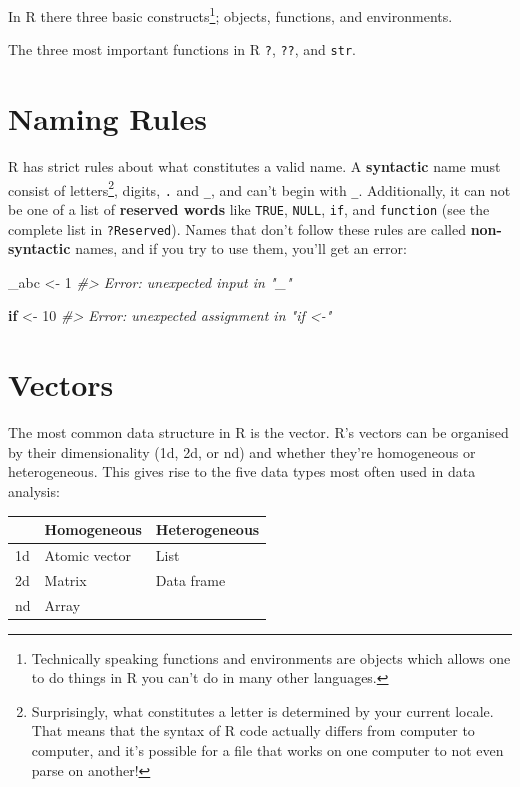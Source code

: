 \documentclass[]{book}
\newenvironment{Shaded}{\begin{snugshade}}{\end{snugshade}}
\newcommand{\DecValTok}[1]{\textcolor[rgb]{0.00,0.00,0.81}{#1}}
\newcommand{\StringTok}[1]{\textcolor[rgb]{0.31,0.60,0.02}{#1}}
\newcommand{\CommentTok}[1]{\textcolor[rgb]{0.56,0.35,0.01}{\textit{#1}}}
\newcommand{\ControlFlowTok}[1]{\textcolor[rgb]{0.13,0.29,0.53}{\textbf{#1}}}
\newcommand{\NormalTok}[1]{#1}
\let\rmarkdownfootnote\footnote%
\def\footnote{\protect\rmarkdownfootnote}
\theoremstyle{definition}
\theoremstyle{definition}
\theoremstyle{definition}
\theoremstyle{remark}
\begin{document}
In R there three basic constructs\footnote{Technically speaking
  functions and environments are objects which allows one to do things
  in R you can't do in many other languages.}; objects, functions, and
environments.

The three most important functions in R \texttt{?}, \texttt{??}, and
\texttt{str}.

\section{Naming Rules}\label{naming-rules}

R has strict rules about what constitutes a valid name. A
\textbf{syntactic} name must consist of letters\footnote{Surprisingly,
  what constitutes a letter is determined by your current locale. That
  means that the syntax of R code actually differs from computer to
  computer, and it's possible for a file that works on one computer to
  not even parse on another!}, digits, \texttt{.} and \texttt{\_}, and
can't begin with \texttt{\_}. Additionally, it can not be one of a list
of \textbf{reserved words} like \texttt{TRUE}, \texttt{NULL},
\texttt{if}, and \texttt{function} (see the complete list in
\texttt{?Reserved}). Names that don't follow these rules are called
\textbf{non-syntactic} names, and if you try to use them, you'll get an
error:

\begin{Shaded}
\begin{Highlighting}[]
\NormalTok{_abc <-}\StringTok{ }\DecValTok{1}
\CommentTok{#> Error: unexpected input in "_"}

\ControlFlowTok{if}\NormalTok{ <-}\StringTok{ }\DecValTok{10}
\CommentTok{#> Error: unexpected assignment in "if <-"}
\end{Highlighting}
\end{Shaded}

\section{Vectors}\label{vectors}

The most common data structure in R is the vector. R's vectors can be
organised by their dimensionality (1d, 2d, or nd) and whether they're
homogeneous or heterogeneous. This gives rise to the five data types
most often used in data analysis:

\begin{longtable}[]{@{}lll@{}}
\toprule
& Homogeneous & Heterogeneous\tabularnewline
\midrule
\endhead
1d & Atomic vector & List\tabularnewline
2d & Matrix & Data frame\tabularnewline
nd & Array &\tabularnewline
\bottomrule
\end{longtable}
\end{document}
